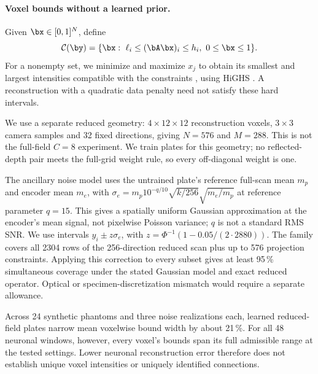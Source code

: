 \paragraph{Voxel bounds without a learned prior.}
Given $\bx\in[0,1]^N$, define
\begin{equation}
\mathcal C(\by)=\{\bx:\ \ell_i\le(\bA\bx)_i\le h_i,\ 0\le\bx\le1\}.
\end{equation}
For a nonempty set, we minimize and maximize $x_j$ to obtain its smallest and largest intensities compatible with the constraints \cite{milanese1991,haldar2023}, using HiGHS \cite{huangfu2018}. A reconstruction with a quadratic data penalty need not satisfy these hard intervals.

We use a separate reduced geometry: $4\times12\times12$ reconstruction voxels, $3\times3$ camera samples and 32 fixed directions, giving $N=576$ and $M=288$. This is not the full-field $C=8$ experiment. We train plates for this geometry; no reflected-depth pair meets the full-grid weight rule, so every off-diagonal weight is one.

The ancillary noise model uses the untrained plate's reference full-scan mean $m_p$ and encoder mean $m_e$, with $\sigma_e=m_p10^{-q/10}\sqrt{k/256}\sqrt{m_e/m_p}$ at reference parameter $q=15$. This gives a spatially uniform Gaussian approximation at the encoder's mean signal, not pixelwise Poisson variance; $q$ is not a standard RMS SNR. We use intervals $y_i\pm z\sigma_e$, with $z=\Phi^{-1}(1-0.05/(2\cdot2880))$. The family covers all 2304 rows of the 256-direction reduced scan plus up to 576 projection constraints. Applying this correction to every subset gives at least 95\,\% simultaneous coverage under the stated Gaussian model and exact reduced operator. Optical or specimen-discretization mismatch would require a separate allowance.

Across 24 synthetic phantoms and three noise realizations each, learned reduced-field plates narrow mean voxelwise bound width by about 21\,\%. For all 48 neuronal windows, however, every voxel's bounds span its full admissible range at the tested settings. Lower neuronal reconstruction error therefore does not establish unique voxel intensities or uniquely identified connections.
